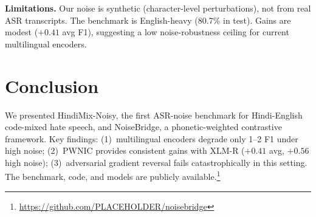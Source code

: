 \documentclass[conference]{IEEEtran}
\begin{document}
\textbf{Limitations.} Our noise is synthetic (character-level perturbations), not from real ASR transcripts. The benchmark is English-heavy (80.7\% in test). Gains are modest ($+0.41$ avg F1), suggesting a low noise-robustness ceiling for current multilingual encoders.

\section{Conclusion}

We presented HindiMix-Noisy, the first ASR-noise benchmark for Hindi-English code-mixed hate speech, and NoiseBridge, a phonetic-weighted contrastive framework. Key findings: (1)~multilingual encoders degrade only 1--2 F1 under high noise; (2)~PWNIC provides consistent gains with XLM-R ($+0.41$ avg, $+0.56$ high noise); (3)~adversarial gradient reversal fails catastrophically in this setting. The benchmark, code, and models are publicly available.\footnote{\url{https://github.com/PLACEHOLDER/noisebridge}}
\end{document}
